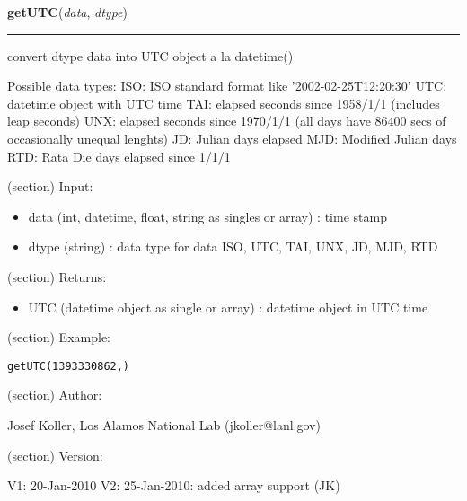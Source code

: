     \label{spacepy:ticktock:getUTC}

    \vspace{0.5ex}

\hspace{.8\funcindent}\begin{boxedminipage}{\funcwidth}

    \raggedright \textbf{getUTC}(\textit{data}, \textit{dtype})

    \vspace{-1.5ex}

    \rule{\textwidth}{0.5\fboxrule}
\setlength{\parskip}{2ex}
    convert dtype data into UTC object a la datetime()

    Possible data types: ISO: ISO standard format like 
    '2002-02-25T12:20:30' UTC: datetime object with UTC time TAI: elapsed 
    seconds since 1958/1/1 (includes leap seconds) UNX: elapsed seconds 
    since 1970/1/1 (all days have 86400 secs of occasionally unequal 
    lenghts) JD: Julian days elapsed MJD: Modified Julian days RTD: Rata 
    Die days elapsed since 1/1/1

    (section) Input:

      \begin{itemize}
      \setlength{\parskip}{0.6ex}
        \item data (int, datetime, float, string as singles or array) : time 
          stamp

        \item dtype (string) : data type for data ISO, UTC, TAI, UNX, JD, MJD, 
          RTD

      \end{itemize}

    (section) Returns:

      \begin{itemize}
      \setlength{\parskip}{0.6ex}
        \item UTC (datetime object as single or array) : datetime object in UTC
          time

      \end{itemize}

    (section) Example:

\begin{alltt}
\pysrcprompt{{\textgreater}{\textgreater}{\textgreater} }getUTC(1393330862, )
\end{alltt}
    (section) Author:

      Josef Koller, Los Alamos National Lab (jkoller@lanl.gov)

    (section) Version:

      V1: 20-Jan-2010 V2: 25-Jan-2010: added array support (JK)

\setlength{\parskip}{1ex}
    \end{boxedminipage}

